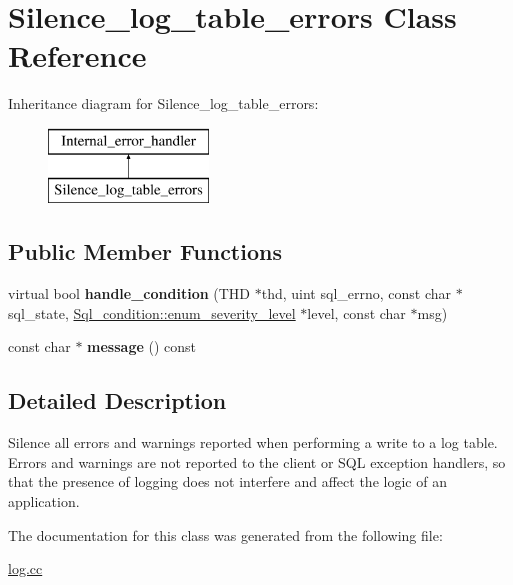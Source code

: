 \hypertarget{classSilence__log__table__errors}{}\section{Silence\+\_\+log\+\_\+table\+\_\+errors Class Reference}
\label{classSilence__log__table__errors}
Inheritance diagram for Silence\+\_\+log\+\_\+table\+\_\+errors\+:\begin{figure}[H]
\begin{center}
\leavevmode
\includegraphics[height=2.000000cm]{classSilence__log__table__errors}
\end{center}
\end{figure}
\subsection*{Public Member Functions}
\begin{DoxyCompactItemize}
\item 
\mbox{\label{classSilence__log__table__errors_a4860f1ee3d6c6def595aa3abb2a66bf4}} 
virtual bool {\bfseries handle\+\_\+condition} (T\+HD $\ast$thd, uint sql\+\_\+errno, const char $\ast$sql\+\_\+state, \mbox{\hyperlink{classSql__condition_ab0602581e19cddb609bfe10c44be4e83}{Sql\+\_\+condition\+::enum\+\_\+severity\+\_\+level}} $\ast$level, const char $\ast$msg)
\item 
\mbox{\label{classSilence__log__table__errors_ab473781419d15bcb936912fc048c3338}} 
const char $\ast$ {\bfseries message} () const
\end{DoxyCompactItemize}


\subsection{Detailed Description}
Silence all errors and warnings reported when performing a write to a log table. Errors and warnings are not reported to the client or S\+QL exception handlers, so that the presence of logging does not interfere and affect the logic of an application. 

The documentation for this class was generated from the following file\+:\begin{DoxyCompactItemize}
\item 
\mbox{\hyperlink{log_8cc}{log.\+cc}}\end{DoxyCompactItemize}
